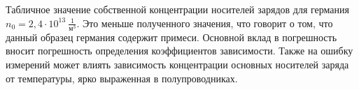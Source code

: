 \documentclass[a4paper, 12pt]{article}
\begin{document}
Табличное значение собственной концентрации носителей зарядов для германия $n_0 = 2,4 \cdot 10^{13}~\frac{1}{м^3}$. Это меньше полученного значения, что говорит о том, что данный образец германия содержит примеси. Основной вклад в погрешность вносит погрешность определения коэффициентов зависимости. Также на ошибку измерений может влиять зависимость концентрации основных носителей заряда от температуры, ярко выраженная в полупроводниках.
\end{document}
